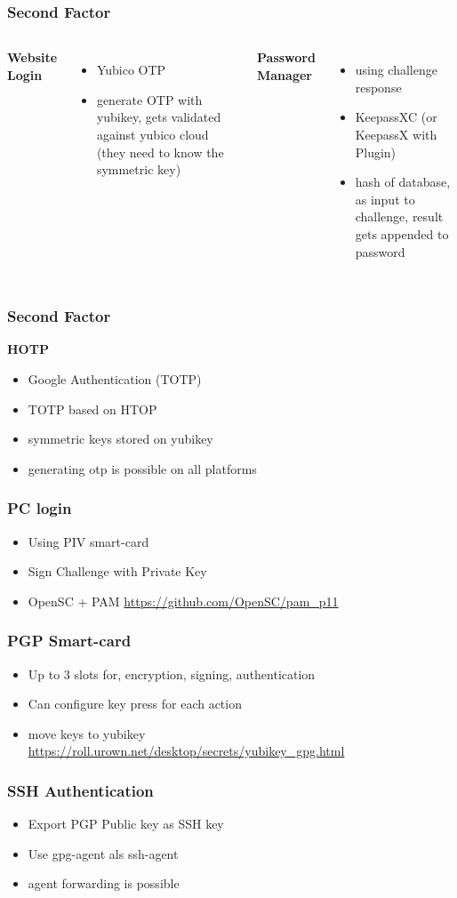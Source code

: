 \documentclass{beamer}
\begin{document}
\begin{frame}
\frametitle{Second Factor}
	\begin{columns}
			\textbf{Website Login}
				\begin{itemize}
					\item{Yubico OTP}
					\item{generate OTP with yubikey, gets validated against yubico cloud (they need to know the symmetric key)}
				\end{itemize}
		\pause
			\textbf{Password Manager}
				\begin{itemize}
					\item{using challenge response}
					\item{KeepassXC (or KeepassX with Plugin)}
					\item{hash of database, as input to challenge, result gets appended to password}
				\end{itemize}
	\end{columns}
\end{frame}

\begin{frame}
\frametitle{Second Factor}
	\textbf{HOTP}
		\begin{itemize}
			\item{Google Authentication (TOTP)}
			\item{TOTP based on HTOP}
			\item{symmetric keys stored on yubikey}
			\item{generating otp is possible on all platforms}
		\end{itemize}
\end{frame}

\begin{frame}
\frametitle{PC login}
	\begin{itemize}
		\item{Using PIV smart-card}
		\item{Sign Challenge with Private Key}
		\item{OpenSC + PAM \url{https://github.com/OpenSC/pam_p11}}
	\end{itemize}
\end{frame}

\begin{frame}
\frametitle{PGP Smart-card}
	\begin{itemize}
		\item{Up to 3 slots for, encryption, signing, authentication}
		\item{Can configure key press for each action}
		\item{move keys to yubikey \url{https://roll.urown.net/desktop/secrets/yubikey_gpg.html}}
	\end{itemize}
\end{frame}

\begin{frame}
\frametitle{SSH Authentication}
	\begin{itemize}
		\item{Export PGP Public key as SSH key}
		\item{Use gpg-agent als ssh-agent}
		\item{agent forwarding is possible}
	\end{itemize}
\end{frame}
\end{document}
